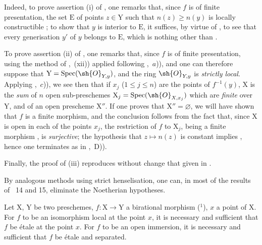 Indeed, to prove assertion (i) of , one remarks that, since $f$ is of finite presentation, the set $\mathrm{E}$ of points $z\in\mathrm{Y}$ such that $n(z)\geq n(y)$ is locally constructible ; to show that $y$ is interior to $\mathrm{E}$, it suffices, by virtue of , to see that every generisation $y'$ of $y$ belongs to $\mathrm{E}$, which is nothing other than .

To prove assertion (ii) of , one remarks that, since $f$ is of finite presentation, using the method of ,~(xii)) applied following ,~$a$)), and one can therefore suppose that $\mathrm{Y}=\operatorname{Spec}(\sh{O}_{Y,y})$, and the ring $\sh{O}_{Y,y}$ is \emph{strictly local}.
Applying ,~$c$)), we see then that if $x_j$ ($1\leq j\leq n$) are the points of $f^{-1}(y)$, $\mathrm{X}$ is the \emph{sum} of $n$ open sub-preschemes $\mathrm{X}_j=\operatorname{Spec}(\sh{O}_{X,x_j})$ which are \emph{finite} over $\mathrm{Y}$, and of an open prescheme $\mathrm{X}''$.
If one proves that $\mathrm{X}''=\varnothing$, we will have shown that $f$ is a finite morphism, and the conclusion follows from the fact that, since $\mathrm{X}$ is open in each of the points $x_j$, the restriction of $f$ to $\mathrm{X}_j$, being a finite morphism , is \emph{surjective}; the hypothesis that $z\mapsto n(z)$ is constant implies , hence one terminates as in ,~D)).

Finally, the proof of (iii) reproduces without change that given in .

\begin{env}[18.10.17.2]
\label{IV.18.10.17.2}
By analogous methods using strict henselisation, one can, in most of the results of \textsection\textsection~14 and 15, eliminate the Noetherian hypotheses.
\end{env}

\begin{lemma}[18.10.18]
\label{IV.18.10.18}
Let $\mathrm{X}$, $\mathrm{Y}$ be two preschemes, $f:\mathrm{X}\to\mathrm{Y}$ a birational morphism (${}^1$), $x$ a point of $\mathrm{X}$.
For $f$ to be an isomorphism local at the point $x$, it is necessary and sufficient that $f$ be \'etale at the point $x$.
For $f$ to be an open immersion, it is necessary and sufficient that $f$ be \'etale and separated.
\end{lemma}



